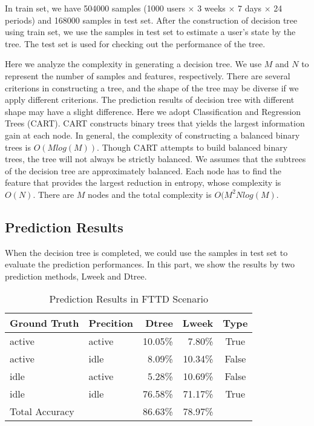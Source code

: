 \documentclass[journal]{IEEEtran}
\begin{document}
In train set, we have 504000 samples (1000 users $\times$ 3 weeks $\times$ 7 days $\times$ 24 periods) and 168000 samples in test set. After the construction of decision tree using train set, we use the samples in test set to estimate a user's state by the tree. The test set is used for checking out the performance of the tree. 

Here we analyze the complexity in generating a decision tree. We use $M$ and $N$ to represent the number of samples and features, respectively. There are several criterions in constructing a tree, and the shape of the tree may be diverse if we apply different criterions. The prediction results of decision tree with different shape may have a slight difference. Here we adopt Classification and Regression Trees (CART). CART constructs binary trees that yields the largest information gain at each node. In general, the complexity of constructing a balanced binary trees is $O(Mlog(M))$. Though CART attempts to build balanced binary trees, the tree will not always be strictly balanced. We assumes that the subtrees of the decision tree are approximately balanced. Each node has to find the feature that provides the largest reduction in entropy, whose complexity is $O(N)$. There are $M$ nodes and the total complexity is $O(M^{2}Nlog(M)$.

\subsection{Prediction Results}
When the decision tree is completed, we could use the samples in test set to evaluate the prediction performances. In this part, we show the results by two prediction methods, Lweek and Dtree.

\begin{table}[H]
\centering
\caption{Prediction Results in FTTD Scenario}
\label{table_FTTD}
\begin{tabular}{llrrc}
  \toprule
Ground Truth & Precition & Dtree & Lweek & Type\\  
  \midrule
active & active & 10.05\% & 7.80\% & True\\  
active & idle & 8.09\% & 10.34\% & False\\ 
idle & active & 5.28\% & 10.69\% & False\\
idle & idle & 76.58\% & 71.17\% & True\\ 
  \midrule
\qquad \qquad Total Accuracy &  & 86.63\% & 78.97\%\\ 
  \bottomrule
\end{tabular}  
\end{table}  
\end{document}
